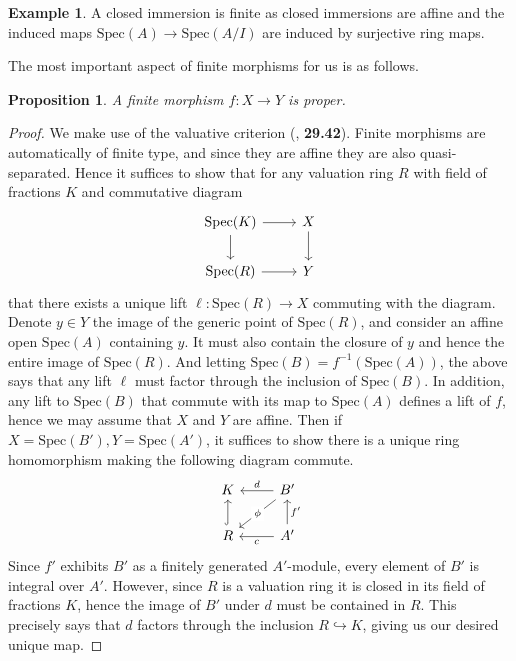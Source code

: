 \documentclass{article}
\theoremstyle{definition}
\newtheorem{example}[theorem]{Example}
\theoremstyle{remark}
\theoremstyle{plain}
\newtheorem{proposition}[theorem]{Proposition}
\begin{document}
\begin{example}
	A closed immersion is finite as closed immersions are affine and the induced maps $\text{Spec}(A) \to \text{Spec}(A/I)$ are induced by surjective ring maps.
\end{example}

The most important aspect of finite morphisms for us is as follows.
\begin{proposition}
	A finite morphism $f: X \to Y$ is proper. 
\end{proposition}
\begin{proof}
	We make use of the valuative criterion (\cite{stacks-project}, \textbf{29.42}).
	Finite morphisms are automatically of finite type, and since they are affine they are also quasi-separated.
	Hence it suffices to show that for any valuation ring $R$ with field of fractions $K$ and commutative diagram
\[\begin{tikzcd}
	{\text{Spec}(K)} & X \\
	{\text{Spec}(R)} & Y
	\arrow[from=1-1, to=1-2]
	\arrow[from=1-1, to=2-1]
	\arrow[from=1-2, to=2-2]
	\arrow[from=2-1, to=2-2]
\end{tikzcd}\]
that there exists a unique lift $\ell: \text{Spec}(R) \to X$ commuting with the diagram.
Denote $y \in Y$ the image of the generic point of $\text{Spec}(R)$, and consider an affine open $\text{Spec}(A)$ containing $y$.
It must also contain the closure of $y$ and hence the entire image of $\text{Spec}(R)$.
And letting $\text{Spec}(B) = f^{-1}(\text{Spec}(A))$, the above says that any lift $\ell$ must factor through the inclusion of $\text{Spec}(B)$.
In addition, any lift to $\text{Spec}(B)$ that commute with its map to $\text{Spec}(A)$ defines a lift of $f$, hence we may assume that $X$ and $Y$ are affine.
Then if $X = \text{Spec}(B'), Y = \text{Spec}(A')$, it suffices to show there is a unique ring homomorphism making the following diagram commute.
\[\begin{tikzcd}
	K & {B'} \\
	R & {A'}
	\arrow["d"', from=1-2, to=1-1]
	\arrow["\phi"{description}, from=1-2, to=2-1]
	\arrow[hook, from=2-1, to=1-1]
	\arrow["{f'}"', from=2-2, to=1-2]
	\arrow["c", from=2-2, to=2-1]
\end{tikzcd}\]
Since $f'$ exhibits $B'$ as a finitely generated $A'$-module, every element of $B'$ is integral over $A'$.
However, since $R$ is a valuation ring it is closed in its field of fractions $K$, hence the image of $B'$ under $d$ must be contained in $R$.
This precisely says that $d$ factors through the inclusion $R \hookrightarrow K$, giving us our desired unique map.
\end{proof}
\end{document}
